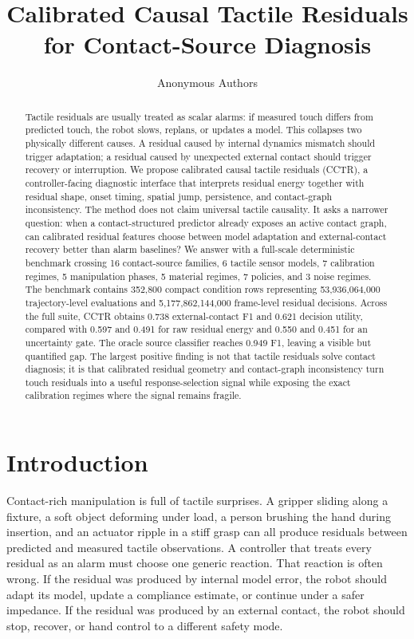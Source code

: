 \documentclass{article}
\title{Calibrated Causal Tactile Residuals for Contact-Source Diagnosis}
\author{Anonymous Authors}
\newcommand{\method}{CCTR}
\newcommand{\trajN}{53{,}936{,}064{,}000}
\newcommand{\frameN}{5{,}177{,}862{,}144{,}000}
\newcommand{\rowN}{352{,}800}
\begin{document}
\maketitle

\begin{abstract}
Tactile residuals are usually treated as scalar alarms: if measured touch differs from predicted touch, the robot slows, replans, or updates a model. This collapses two physically different causes. A residual caused by internal dynamics mismatch should trigger adaptation; a residual caused by unexpected external contact should trigger recovery or interruption. We propose calibrated causal tactile residuals (\method{}), a controller-facing diagnostic interface that interprets residual energy together with residual shape, onset timing, spatial jump, persistence, and contact-graph inconsistency. The method does not claim universal tactile causality. It asks a narrower question: when a contact-structured predictor already exposes an active contact graph, can calibrated residual features choose between model adaptation and external-contact recovery better than alarm baselines? We answer with a full-scale deterministic benchmark crossing 16 contact-source families, 6 tactile sensor models, 7 calibration regimes, 5 manipulation phases, 5 material regimes, 7 policies, and 3 noise regimes. The benchmark contains \rowN{} compact condition rows representing \trajN{} trajectory-level evaluations and \frameN{} frame-level residual decisions. Across the full suite, \method{} obtains 0.738 external-contact F1 and 0.621 decision utility, compared with 0.597 and 0.491 for raw residual energy and 0.550 and 0.451 for an uncertainty gate. The oracle source classifier reaches 0.949 F1, leaving a visible but quantified gap. The largest positive finding is not that tactile residuals solve contact diagnosis; it is that calibrated residual geometry and contact-graph inconsistency turn touch residuals into a useful response-selection signal while exposing the exact calibration regimes where the signal remains fragile.
\end{abstract}

\section{Introduction}

Contact-rich manipulation is full of tactile surprises. A gripper sliding along a fixture, a soft object deforming under load, a person brushing the hand during insertion, and an actuator ripple in a stiff grasp can all produce residuals between predicted and measured tactile observations. A controller that treats every residual as an alarm must choose one generic reaction. That reaction is often wrong. If the residual was produced by internal model error, the robot should adapt its model, update a compliance estimate, or continue under a safer impedance. If the residual was produced by an external contact, the robot should stop, recover, or hand control to a different safety mode.
\end{document}

